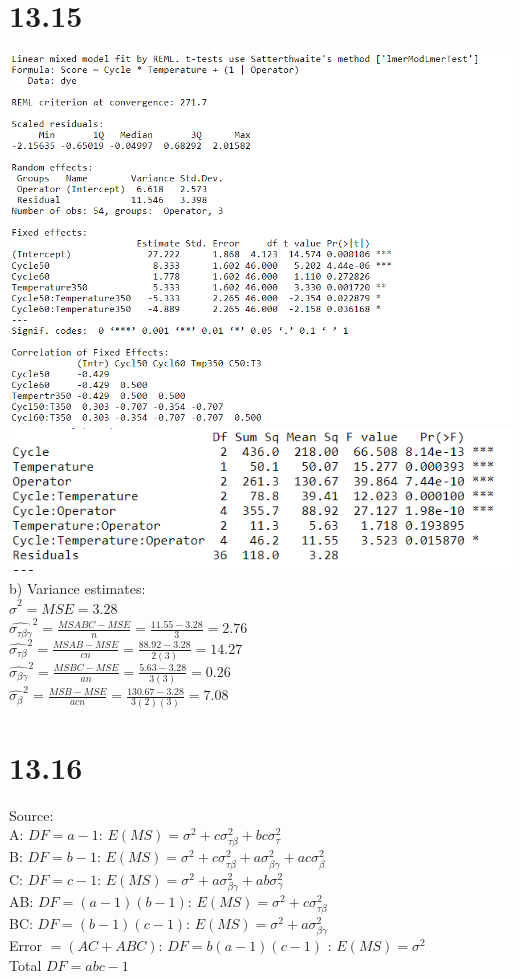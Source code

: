\documentclass{article}
\begin{document}
\section*{13.15}
\includegraphics{13.15.PNG}
\\\includegraphics{13.15aov.PNG}
\\b) Variance estimates:
\\$\hat{\sigma}^2 = MSE = 3.28$
\\$\hat{\sigma_{\tau\beta\gamma}}^2 = \frac{MSABC - MSE}{n} = \frac{11.55 - 3.28}{3} = 2.76$
\\$\hat{\sigma_{\tau\beta}}^2 = \frac{MSAB - MSE}{cn} = \frac{88.92 - 3.28}{2(3)} = 14.27$
\\$\hat{\sigma_{\beta\gamma}}^2 = \frac{MSBC - MSE}{an} = \frac{5.63 - 3.28}{3(3)} = 0.26$
\\$\hat{\sigma_{\beta}}^2 = \frac{MSB - MSE}{acn} = \frac{130.67 - 3.28}{3(2)(3)} = 7.08$

\section*{13.16}
Source:
\\A: $DF = a - 1$: $E(MS) = \sigma^2 + c\sigma_{\tau\beta}^2 + bc\sigma_{\tau}^2$
\\B: $DF = b - 1$: $E(MS) = \sigma^2 + c\sigma_{\tau\beta}^2 + a\sigma_{\beta\gamma}^2 + ac\sigma_{\beta}^2$
\\C: $DF = c - 1$: $E(MS) = \sigma^2 + a\sigma_{\beta\gamma}^2 + ab\sigma_{\gamma}^2$
\\AB: $DF = (a - 1)(b - 1)$: $E(MS) = \sigma^2 + c\sigma_{\tau\beta}^2$
\\BC: $DF = (b - 1)(c - 1)$: $E(MS) = \sigma^2 + a\sigma_{\beta\gamma}^2$
\\Error $ = (AC + ABC)$: $DF = b(a - 1)(c - 1)$ : $E(MS) = \sigma^2$
\\Total $DF = abc - 1$
\end{document}

